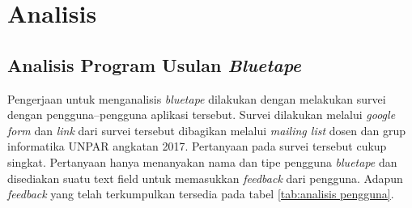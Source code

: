 
\chapter{Analisis}
\section{Analisis Program Usulan \textit{Bluetape}}
Pengerjaan untuk menganalisis \textit{bluetape} dilakukan dengan melakukan survei dengan pengguna--pengguna aplikasi tersebut. Survei dilakukan melalui \textit{google form} dan \textit{link} dari survei tersebut dibagikan melalui \textit{mailing list} dosen dan grup informatika UNPAR angkatan 2017. Pertanyaan pada survei tersebut cukup singkat. Pertanyaan hanya menanyakan nama dan tipe pengguna \textit{bluetape} dan disediakan suatu text field untuk memasukkan \textit{feedback} dari pengguna. Adapun \textit{feedback} yang telah terkumpulkan tersedia pada tabel \ref{tab:analisis pengguna}.

